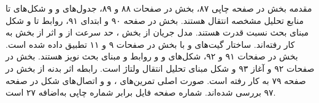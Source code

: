 مقدمه بخش  در صفحه چاپی ۸۷، بخش 
در صفحات ۸۸ و ۸۹، جدول‌های  و  و شکل‌های
 تا  منابع تحلیل مشخصه انتقال  هستند.
بخش  در صفحه ۹۰ و ابتدای ۹۱، روابط
 تا  و شکل  مبنای بحث
نسبت قدرت هستند. مدل جریان  از بخش
، حد سرعت از  و اثر
 از بخش  به کار رفته‌اند.
ساختار گیت‌های  و  با بخش 
در صفحات ۹ و ۱۱ تطبیق داده شده است.
بخش  در صفحات ۹۱ و ۹۲، شکل‌های
 و  و روابط  و
 مبنای بحث نویز هستند.
بخش  در صفحات ۹۲ و آغاز ۹۳ و شکل
 مبنای تحلیل انتقال ولتاژ است. رابطه اثر بدنه
از بخش  در صفحه ۷۹ به کار رفته است.
صورت اصلی تمرین‌های ،  و  و اتصال‌های شکل
 در صفحه ۹۷ بررسی شده‌اند.
شماره صفحه فایل  برابر شماره چاپی به‌اضافه ۲۷ است.
